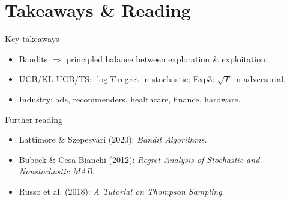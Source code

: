\documentclass[aspectratio=169]{beamer}
\begin{document}
\section{Takeaways \& Reading}

\begin{frame}{Key takeaways}
\small
\begin{itemize}
  \item Bandits \(\Rightarrow\) principled balance between exploration \& exploitation.
  \item UCB/KL-UCB/TS: \(\log T\) regret in stochastic; Exp3: \(\sqrt{T}\) in adversarial.
  \item Industry: ads, recommenders, healthcare, finance, hardware.
\end{itemize}
\end{frame}

\begin{frame}{Further reading}
\small
\begin{itemize}
  \item Lattimore \& Szepesvári (2020): \emph{Bandit Algorithms}.
  \item Bubeck \& Cesa-Bianchi (2012): \emph{Regret Analysis of Stochastic and Nonstochastic MAB}.
  \item Russo et al. (2018): \emph{A Tutorial on Thompson Sampling}.
\end{itemize}
\end{frame}
\end{document}
